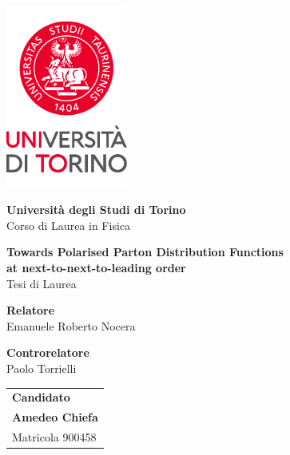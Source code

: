 \begin{titlepage}
  \centering
  \vspace*{0.5cm}

  \includegraphics[width=0.3\textwidth]{./images/newlogo.pdf}

  \vspace{1.5cm}

  \LARGE
  \textbf{Università degli Studi di Torino}\\

  \vspace{1mm}
  Corso di Laurea in Fisica
        
  \vspace{2cm}

  \textbf{Towards Polarised Parton Distribution Functions}\\
  \textbf{at next-to-next-to-leading order}\\
  Tesi di Laurea\\

  \vfill

  \raggedright

  \large

  \textbf{Relatore}\\
  Emanuele Roberto Nocera\\

  \vspace{10mm}

  \textbf{Controrelatore}\\
  Paolo Torrielli\\

  \vspace{5mm}

  \begin{flushright}
    \begin{tabular}{@{}l@{}}
      \textbf{Candidato}\\
      \textbf{Amedeo Chiefa}\\
      Matricola 900458
      \end{tabular}
  \end{flushright}


\end{titlepage}